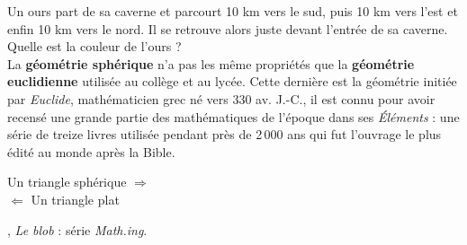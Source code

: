 \vspace*{-9mm}

\vspace*{-4mm}

\vspace*{-7mm}
\begin{debat}
   \og Un ours part de sa caverne et parcourt 10 km vers le sud, puis 10 km vers l'est et enfin 10 km vers le nord. Il se retrouve alors juste devant l'entrée de sa caverne. Quelle est la couleur de l'ours ? \fg \\
   La {\bf géométrie sphérique} n'a pas les même propriétés que la {\bf géométrie euclidienne} utilisée au collège et au lycée. Cette dernière est la géométrie initiée par {\it Euclide}, mathématicien grec né vers 330 av. J.-C., il est connu pour avoir recensé une grande partie des mathématiques de l'époque dans ses {\it Éléments} : une série de treize livres utilisée pendant près de 2\,000 ans qui fut l'ouvrage le plus édité au monde après la Bible.\\
   \begin{minipage}{5cm}
      \scalebox{0.8}{
      \begin{pspicture}(-1,0.5)(4,3)
         \pspolygon[linecolor=C1](1,0)(4,0)(3,3.25)
      \end{pspicture}
      }
   \end{minipage}
   \textcolor{B1}{
   \begin{minipage}{5cm}
      \flushright Un triangle \og sphérique \fg{} $\Longrightarrow$ \\
      \flushleft $\Longleftarrow$ Un triangle \og plat \fg \\     
   \end{minipage}}
   \begin{minipage}{5cm}
   \end{minipage} 
  \bigskip
   \begin{cadre}[B2][J4]
      \begin{center}
         , {\it Le blob} : série {\it Math.ing}.
      \end{center}
   \end{cadre}
\end{debat}
